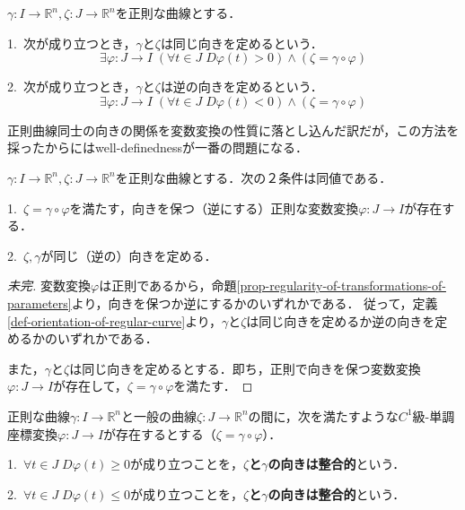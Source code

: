 \documentclass[uplatex, 12pt, dvipdfmx]{jsarticle}
\begin{document}
\begin{definition}[正則曲線同士の向き]\label{def-orientation-of-regular-curve}
    $\gamma:I\to\mathbb{R}^n, \zeta:J\to\mathbb{R}^n$を正則な曲線とする．

    1.\, 次が成り立つとき，$\gamma$と$\zeta$は同じ向きを定めるという．
    \[ \exists \varphi:J\to I\; (\forall t\in J\; D\varphi(t)>0) \land (\zeta=\gamma\circ\varphi) \]

    2.\, 次が成り立つとき，$\gamma$と$\zeta$は逆の向きを定めるという．
    \[ \exists \varphi:J\to I\; (\forall t\in J\; D\varphi(t)<0) \land (\zeta=\gamma\circ\varphi) \]
\end{definition}

正則曲線同士の向きの関係を変数変換の性質に落とし込んだ訳だが，この方法を採ったからにはwell-definednessが一番の問題になる．

\begin{proposition}
    $\gamma:I\to\mathbb{R}^n, \zeta:J\to\mathbb{R}^n$を正則な曲線とする．次の２条件は同値である．
    
    1.\, $\zeta=\gamma\circ\varphi$を満たす，向きを保つ（逆にする）正則な変数変換$\varphi:J\to I$が存在する．

    2.\, $\zeta,\gamma$が同じ（逆の）向きを定める．
\end{proposition}
\begin{proof}[未完]
    変数変換$\varphi$は正則であるから，命題\ref{prop-regularity-of-transformations-of-parameters}より，向きを保つか逆にするかのいずれかである．
    従って，定義\ref{def-orientation-of-regular-curve}より，$\gamma$と$\zeta$は同じ向きを定めるか逆の向きを定めるかのいずれかである．

    また，$\gamma$と$\zeta$は同じ向きを定めるとする．即ち，正則で向きを保つ変数変換$\varphi:J\to I$が存在して，$\zeta=\gamma\circ\varphi$を満たす．
\end{proof}

\begin{definition}\rm{}
    正則な曲線$\gamma:I\to\mathbb{R}^n$と一般の曲線$\zeta:J\to\mathbb{R}^n$の間に，次を満たすような$C^1$級-単調座標変換$\varphi:J\to I$が存在するとする（$\zeta =\gamma\circ\varphi$）．

    1.\, $\forall t\in J \; D\varphi (t)\ge 0$が成り立つことを，\textbf{$\zeta$と$\gamma$の向きは整合的}という．

    2.\, $\forall t\in J \; D\varphi (t)\le 0$が成り立つことを，\textbf{$\zeta$と$\gamma$の向きは整合的}という．
\end{definition}
\end{document}

